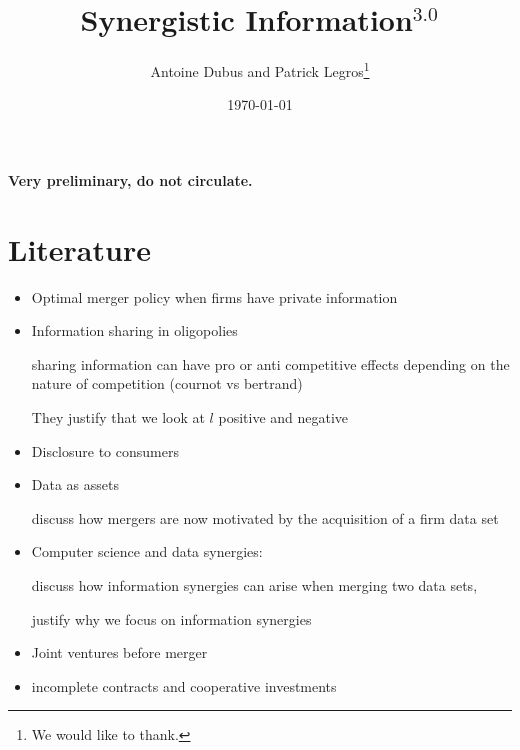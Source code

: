 \documentclass[a4paper]{article}
\begin{document}
\title{Synergistic Information$^{3.0}$}
\author{Antoine Dubus and Patrick Legros\thanks{We would like to thank.}}
\date{\today}


\maketitle

\begin{abstract}

\noindent 

\end{abstract}
 
\textbf{Very preliminary, do not circulate.}

\baselineskip0.7cm

\section{Literature}
\begin{itemize}\setlength\itemsep{-1em}
    \item Optimal merger policy when firms have private information \cite{Besanko1993}
    \item Information sharing in oligopolies
    
    \cite{vives1984duopoly, gal1986information} sharing information can have pro or anti competitive effects depending on the nature of competition (cournot vs bertrand)
    
    They justify that we look at $l$ positive and negative
    \item Disclosure to consumers 
    \item Data as assets
    
    \cite{stucke2016introduction} discuss how mergers are now motivated by the acquisition of a firm data set
    \item Computer science and data synergies:
    
    \cite{bertschinger2014quantifying, Griffith2014, olbrich2015information} discuss how information synergies can arise when merging two data sets, 
    
    justify why we focus on information synergies
    \item Joint ventures before merger
    \item incomplete contracts and cooperative investments \citep{Che1999}
\end{itemize}
\end{document}
